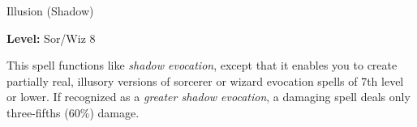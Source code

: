 \label{spell:Greater Shadow Evocation}

Illusion (Shadow)

\textbf{Level:} Sor/Wiz 8

This spell functions like \textit{shadow evocation}, except that it enables you 
to create partially real, illusory versions of sorcerer or wizard evocation spells 
of 7th level or lower. If recognized as a \textit{greater shadow evocation}, a 
damaging spell deals only three-fifths (60\%) damage.

